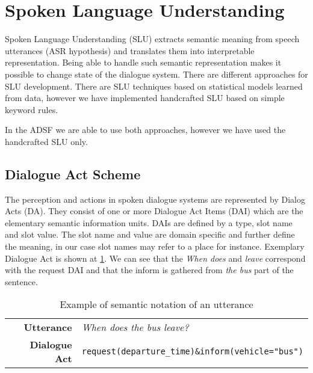 \section{Spoken Language Understanding}

Spoken Language Understanding (SLU) extracts semantic meaning from speech utterances (ASR hypothesis) and translates them into interpretable representation.
Being able to handle such semantic representation makes it possible to change state of the dialogue system.
There are different approaches for SLU development.
There are SLU techniques based on statistical models learned from data, however we have implemented handcrafted SLU based on simple keyword rules.  %





In the ADSF we are able to use both approaches, however we have used the handcrafted SLU only.





\subsection{Dialogue Act Scheme}

The perception and actions in spoken dialogue systems are represented by Dialog Acts (DA).
They consist of one or more Dialogue Act Items (DAI) which are the elementary semantic information units.
DAIs are defined by a type, slot name and slot value.
The slot name and value are domain specific and further define the meaning, in our case slot names may refer to a place for instance.
Exemplary Dialogue Act is shown at \ref{table:utterance}. We can see that the \textit{When does} and \textit{leave} correspond with the request DAI and that the inform is gathered from \textit{the bus} part of the sentence.

\begin{table}[h]
\centering
\begin{tabular}{ r | l }
	\textbf{Utterance} & \textit{When does the bus leave?} \\
	\textbf{Dialogue Act} & \texttt{request(departure\_time)\&inform(vehicle="bus")}
\end{tabular}
\caption{Example of semantic notation of an utterance}
\label{table:utterance}
\end{table}

